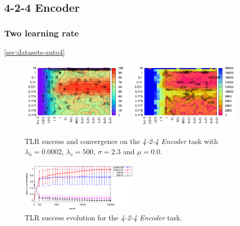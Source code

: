 \subsection{4-2-4 Encoder} 

\subsubsection{Two learning rate} 
\label{sec:tlr-auto4} 
\ref{sec:datasets-auto4} 
\begin{figure}[H]
  \centering
  \includegraphics[width=0.48\textwidth]{img/tlr-auto4-success.pdf}   
  \includegraphics[width=0.48\textwidth]{img/tlr-auto4-epoch.pdf}     
  \caption{TLR success and convergence on the \emph{4-2-4 Encoder} task with $\lambda_h=0.0002$, $\lambda_v=500$, $\sigma = 2.3$ and $\mu = 0.0$.}
  \label{fig:results-tlr-auto4-performance}
\end{figure}

\begin{figure}[H]
  \centering
  \includegraphics[width=0.5\textwidth]{img/tlr-best-perf.pdf}      
  \caption{TLR success evolution for the \emph{4-2-4 Encoder} task.}
  \label{fig:results-tlr-auto4-epoch} 
\end{figure}

